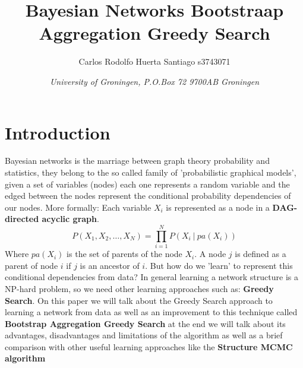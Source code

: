 \documentclass{article}
\title{\textbf{\huge Bayesian Networks Bootstraap Aggregation Greedy Search}}
\author{Carlos Rodolfo Huerta Santiago s3743071}
\date{\textit{University of Groningen, P.O.Box 72 9700AB Groningen}}
\begin{document}
	\maketitle %
	\thispagestyle{empty}

	\section{Introduction}
	Bayesian networks is the marriage between graph theory probability and
	statistics, they belong to the so called family of 'probabilistic graphical
	models', given a set of variables (nodes) each one represents a random
	variable and the edged between the nodes represent the conditional
	probability dependencies of our nodes. More formally: Each variable $X_{i}$
	is represented as a node in a \textbf{DAG-directed acyclic
	graph}\cite{bnsBasics}.
	\begin{equation}
		P(X_{1}, X_{2}, \dots ,X_{N}) = \prod_{i=1}^{N} P(X_{i} \ | \ pa(X_{i}))	
	\end{equation}
	Where $pa(X_{i})$ is the set of parents of the node $X_{i}$. A node $j$ is
	defined as a parent of node $i$ if $j$ is an ancestor of $i$. 
	But how do we 'learn' to represent
	this conditional dependencies from data? In general learning a network
	structure is a NP-hard problem, so we need other learning approaches such as:
	\textbf{Greedy Search}. On this paper we will talk about the Greedy Search
	approach to learning a network from data as well as an improvement to this
	technique called \textbf{Bootstrap Aggregation Greedy Search} at the end we will talk
	about its advantages, disadvantages and limitations of the algorithm as well
	as a brief comparison with other useful learning approaches like the
	\textbf{Structure MCMC algorithm}
\end{document}
